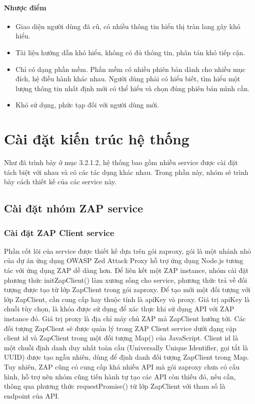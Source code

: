 \paragraph{Nhược điểm}
\begin{itemize}
  \item Giao diện người dùng đã cũ, có nhiều thông tin hiển thị tràn lang gây khó hiểu.
  \item Tài liệu hướng dẫn khó hiểu, không có đủ thông tin, phân tán khó tiếp cận.
  \item Chỉ có dạng phần mềm. Phần mềm có nhiều phiên bản dành cho nhiều mục đích, hệ điều hành khác nhau. Người dùng phải có hiểu biết, tìm hiểu một lượng thông tin nhất định mới có thể hiểu và chọn đúng phiên bản mình cần.
  \item Khó sử dụng, phức tạp đối với người dùng mới.
\end{itemize}

\section{Cài đặt kiến trúc hệ thống}

\tab Như đã trình bày ở mục 3.2.1.2, hệ thống bao gồm nhiều service được cài đặt tách biệt với nhau và có các tác dụng khác nhau. Trong phần này, nhóm sẽ trình bày cách thiết kế của các service này.

\subsection{Cài đặt nhóm ZAP service}

\subsubsection{Cài đặt ZAP Client service}

\tab Phần cốt lõi của service được thiết kế dựa trên gói zaproxy, gói là một nhánh nhỏ của dự án ứng dụng OWASP Zed Attack Proxy hỗ trợ ứng dụng Node.js tương tác với ứng dụng ZAP dễ dàng hơn. Để liên kết một ZAP instance, nhóm cài đặt phương thức initZapClient() làm xương sống cho service, phương thức trả về đối tượng được tạo từ lớp ZapClient trong gói zaproxy. Để tạo mới một đối tượng với lớp ZapClient, cần cung cấp hay thuộc tính là apiKey và proxy. Giá trị apiKey là chuỗi tùy chọn, là khóa được sử dụng để xác thực khi sử dụng API với ZAP instance đó. Giá trị proxy là địa chỉ máy chủ ZAP mà ZapClient hướng tới. Các đối tượng ZapClient sẽ được quản lý trong ZAP Client service dưới dạng cặp client id và ZapClient trong một đối tượng Map() của JavaScript. Client id là một chuỗi định danh duy nhất toàn cầu (Universally Unique Identifier, gọi tắt là UUID) được tạo ngẫu nhiên, dùng để định danh đối tượng ZapClient trong Map. Tuy nhiên, ZAP cũng có cung cấp khá nhiều API mà gói zaproxy chưa có cấu hình, hỗ trợ nên nhóm cũng tiến hành tự tạo các API còn thiếu đó, nếu cần, thông qua phương thức requestPromise() từ lớp ZapClient với tham số là endpoint của API.
\par

